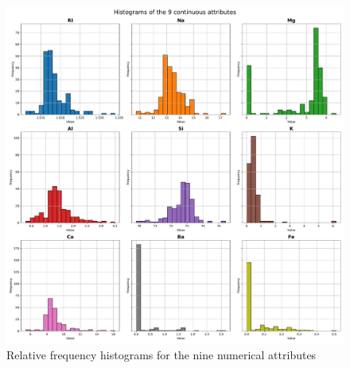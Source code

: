\documentclass[dtu]{dtuarticle}
\begin{document}
	\begin{figure}
		\centering
		\includegraphics[width=.8\textwidth]{figures/histograms}
		\caption{Relative frequency histograms for the nine numerical attributes}
		\label{fig:histograms}
	\end{figure}
\end{document}
